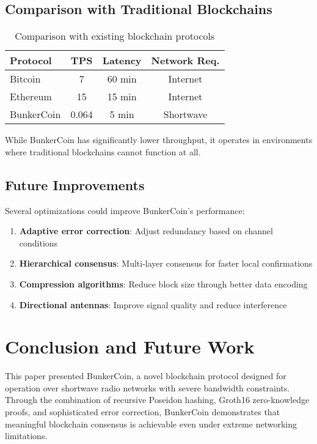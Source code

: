 \documentclass[11pt,a4paper]{article}
\begin{document}
\subsection{Comparison with Traditional Blockchains}

\begin{table}[h]
\centering
\caption{Comparison with existing blockchain protocols}
\begin{tabular}{@{}lccc@{}}
\toprule
Protocol & TPS & Latency & Network Req. \\
\midrule
Bitcoin & 7 & 60 min & Internet \\
Ethereum & 15 & 15 min & Internet \\
BunkerCoin & 0.064 & 5 min & Shortwave \\
\bottomrule
\end{tabular}
\end{table}

While BunkerCoin has significantly lower throughput, it operates in environments where traditional blockchains cannot function at all.

\subsection{Future Improvements}

Several optimizations could improve BunkerCoin's performance:

\begin{enumerate}
\item \textbf{Adaptive error correction}: Adjust redundancy based on channel conditions
\item \textbf{Hierarchical consensus}: Multi-layer consensus for faster local confirmations
\item \textbf{Compression algorithms}: Reduce block size through better data encoding
\item \textbf{Directional antennas}: Improve signal quality and reduce interference
\end{enumerate}

\section{Conclusion and Future Work}

This paper presented BunkerCoin, a novel blockchain protocol designed for operation over shortwave radio networks with severe bandwidth constraints. Through the combination of recursive Poseidon hashing, Groth16 zero-knowledge proofs, and sophisticated error correction, BunkerCoin demonstrates that meaningful blockchain consensus is achievable even under extreme networking limitations.
\end{document}
